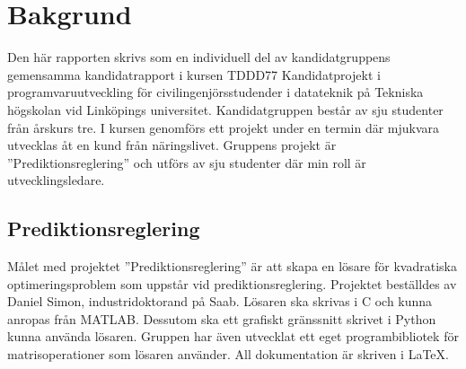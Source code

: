 \section{Bakgrund}
Den här rapporten skrivs som en individuell del av kandidatgruppens gemensamma kandidatrapport i kursen TDDD77 Kandidatprojekt i programvaruutveckling för civilingenjörsstudender i datateknik på Tekniska högskolan vid Linköpings universitet. Kandidatgruppen består av sju studenter från årskurs tre. I kursen genomförs ett projekt under en termin där mjukvara utvecklas åt en kund från näringslivet. Gruppens projekt är ''Prediktionsreglering'' och utförs av sju studenter där min roll är utvecklingsledare. 

\subsection{Prediktionsreglering}
Målet med projektet ''Prediktionsreglering'' är att skapa en lösare för kvadratiska optimeringsproblem som uppstår vid prediktionsreglering. Projektet beställdes av Daniel Simon, industridoktorand på Saab. Lösaren ska skrivas i C och kunna anropas från MATLAB. Dessutom ska ett grafiskt gränssnitt skrivet i Python kunna använda lösaren. Gruppen har även utvecklat ett eget programbibliotek för matrisoperationer som lösaren använder. All dokumentation är skriven i \LaTeX.
